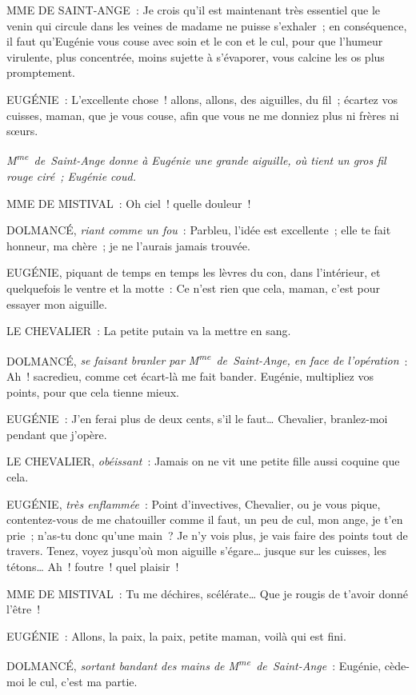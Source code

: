 \documentclass[french,twoside]{book} %
\begin{document}
MME DE SAINT-ANGE : Je crois qu’il est maintenant très essentiel que le venin qui circule dans les veines de madame ne puisse s’exhaler ; en conséquence, il faut qu’Eugénie vous couse avec soin et le con et le cul, pour que l’humeur virulente, plus concentrée, moins sujette à s’évaporer, vous calcine les os plus promptement.\par
EUGÉNIE : L’excellente chose ! allons, allons, des aiguilles, du fil ; écartez vos cuisses, maman, que je vous couse, afin que vous ne me donniez plus ni frères ni sœurs.\par
{\itshape M\textsuperscript{me} de Saint-Ange donne à Eugénie une grande aiguille, où tient un gros fil rouge ciré ; Eugénie coud. }\par
MME DE MISTIVAL : Oh ciel ! quelle douleur !\par
DOLMANCÉ, {\itshape riant comme un fou} : Parbleu, l’idée est excellente ; elle te fait honneur, ma chère ; je ne l’aurais jamais trouvée.\par
EUGÉNIE, piquant de temps en temps les lèvres du con, dans l’intérieur, et quelquefois le ventre et la motte : Ce n’est rien que cela, maman, c’est pour essayer mon aiguille.\par
LE CHEVALIER : La petite putain va la mettre en sang.\par
DOLMANCÉ, {\itshape se faisant branler par M\textsuperscript{me} de Saint-Ange, en face de l’opération} : Ah ! sacredieu, comme cet écart-là me fait bander. Eugénie, multipliez vos points, pour que cela tienne mieux.\par
EUGÉNIE : J’en ferai plus de deux cents, s’il le faut… Chevalier, branlez-moi pendant que j’opère.\par
LE CHEVALIER, {\itshape obéissant} : Jamais on ne vit une petite fille aussi coquine que cela.\par
EUGÉNIE, {\itshape très enflammée} : Point d’invectives, Chevalier, ou je vous pique, contentez-vous de me chatouiller comme il faut, un peu de cul, mon ange, je t’en prie ; n’as-tu donc qu’une main ? Je n’y vois plus, je vais faire des points tout de travers. Tenez, voyez jusqu’où mon aiguille s’égare… jusque sur les cuisses, les tétons… Ah ! foutre ! quel plaisir !\par
MME DE MISTIVAL : Tu me déchires, scélérate… Que je rougis de t’avoir donné l’être !\par
EUGÉNIE : Allons, la paix, la paix, petite maman, voilà qui est fini.\par
DOLMANCÉ, {\itshape sortant bandant des mains de M\textsuperscript{me} de Saint-Ange} : Eugénie, cède-moi le cul, c’est ma partie.\par
\end{document}
